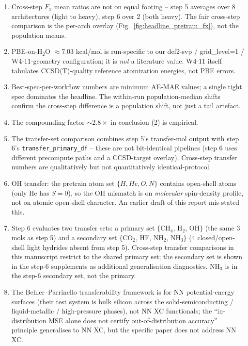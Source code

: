 \documentclass[11pt,letterpaper]{article}
\begin{document}
\begin{enumerate}
\item Cross-step $F_x$ mean ratios are not on equal footing -- step 5 averages over 8
architectures (light to heavy), step 6 over 2 (both heavy). The fair cross-step
comparison is the per-arch overlay (Fig.~\ref{fig:headline_pretrain_fx}), not the population means.

\item PBE-on-H$_2$O $\approx 7.03$ kcal/mol is run-specific to our def2-svp /
grid\_level=1 / W4-11-geometry configuration; it is \emph{not} a literature value.
W4-11 itself \citep{KartonDaonMartin2011} tabulates CCSD(T)-quality reference
atomization energies, not PBE errors.

\item Best-spec-per-workflow numbers are minimum AE-MAE values; a single tight spec
dominates the headline. The within-run population-median shifts confirm the cross-step
difference is a population shift, not just a tail artefact.

\item The compounding factor $\sim 2.8\times$ in conclusion (2) is empirical.

\item The transfer-set comparison combines step 5's transfer-mol output with step 6's
\texttt{transfer\_primary\_df} -- these are not bit-identical pipelines (step 6 uses
different precompute paths and a CCSD-target overlay). Cross-step transfer numbers are
qualitatively but not quantitatively identical-protocol.

\item OH transfer: the pretrain atom set $\{H, He, O, N\}$ contains open-shell atoms
(only He has $S=0$), so the OH mismatch is on \emph{molecular} spin-density profile, not
on atomic open-shell character. An earlier draft of this report mis-stated this.

\item Step 6 evaluates two transfer sets: a primary set
$\{$CH$_4$, H$_2$, OH$\}$ (the same 3 mols as step 5) and a secondary set
$\{$CO$_2$, HF, NH$_2$, NH$_3\}$ (4 closed/open-shell light hydrides
absent from step 5). Cross-step transfer comparisons in this manuscript
restrict to the shared primary set; the secondary set is shown in
the step-6 supplements as additional generalisation diagnostics. NH$_3$
is in the step-6 secondary set, not the primary.

\item The Behler--Parrinello transferability framework \citep{BehlerParrinello2007}
is for NN potential-energy surfaces (their test system is bulk silicon
across the solid-semiconducting / liquid-metallic / high-pressure phases),
not NN XC functionals; the ``in-distribution MSE alone does not certify
out-of-distribution accuracy'' principle generalises to NN XC, but the
specific paper does not address NN XC.


\end{enumerate}
\end{document}
